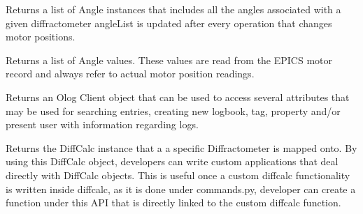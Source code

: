 \documentclass[letterpaper,10pt,english]{sphinxmanual}
\begin{document}
\begin{fulllineitems}
\begin{fulllineitems}
\end{fulllineitems}


\begin{fulllineitems}
\label{Manual:Diffractometer.Diffractometer.getAngleNames}
Returns a list of Angle instances that includes all the angles associated with a given diffractometer
angleList is updated after every operation that changes motor positions.

\end{fulllineitems}


\begin{fulllineitems}
\label{Manual:Diffractometer.Diffractometer.getAngleValues}
Returns a list of Angle values. These values are read from the EPICS motor record
and always refer to actual motor position readings.

\end{fulllineitems}


\begin{fulllineitems}
\label{Manual:Diffractometer.Diffractometer.getClient}
Returns an Olog Client object that can be used to access several attributes that may be used for searching entries, creating new logbook, tag, property and/or present user with information regarding logs.

\end{fulllineitems}


\begin{fulllineitems}
\label{Manual:Diffractometer.Diffractometer.getDCInstance}
Returns the DiffCalc instance that a a specific Diffractometer is mapped onto. By using this DiffCalc object, developers can write custom applications that deal directly with DiffCalc objects. This is useful once a custom diffcalc functionality is written inside diffcalc, as it is done under commands.py, developer can create a function under this API that is directly linked to the custom diffcalc function.


\end{fulllineitems}
\end{fulllineitems}
\end{document}
